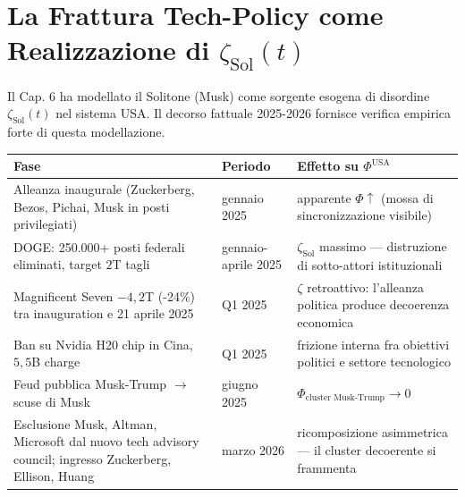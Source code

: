 \section{\texorpdfstring{La Frattura Tech-Policy come Realizzazione di
\(\zeta_{\text{Sol}}(t)\)}{La Frattura Tech-Policy come Realizzazione di \textbackslash zeta\_\{\textbackslash text\{Sol\}\}(t)}}\label{la-frattura-tech-policy-come-realizzazione-di-zeta_textsolt}

Il Cap. 6 ha modellato il Solitone (Musk) come sorgente esogena di
disordine \(\zeta_{\text{Sol}}(t)\) nel sistema USA. Il decorso fattuale
2025-2026 fornisce verifica empirica forte di questa modellazione.

{\def\LTcaptype{none} %
{\small\begin{longtable}[]{@{}
  >{\raggedright\arraybackslash}p{}
  >{\raggedright\arraybackslash}p{}
  >{\raggedright\arraybackslash}p{}@{}}
\toprule\noalign{}
\begin{minipage}[b]{\linewidth}\raggedright
Fase
\end{minipage} & \begin{minipage}[b]{\linewidth}\raggedright
Periodo
\end{minipage} & \begin{minipage}[b]{\linewidth}\raggedright
Effetto su \(\Phi^{\text{USA}}\)
\end{minipage} \\
\midrule\noalign{}
\endhead
\bottomrule\noalign{}
\endlastfoot
Alleanza inaugurale (Zuckerberg, Bezos, Pichai, Musk in posti
privilegiati) & 20 gennaio 2025 & apparente \(\Phi \uparrow\) (mossa di
sincronizzazione visibile) \\
DOGE: 250.000+ posti federali eliminati, target \(2\)T tagli &
gennaio-aprile 2025 & \(\zeta_{\text{Sol}}\) massimo --- distruzione di
sotto-attori istituzionali \\
Magnificent Seven \(-4{,}2\)T (-24\%) tra inauguration e 21 aprile 2025
& Q1 2025 & \(\zeta\) retroattivo: l'alleanza politica produce
decoerenza economica \\
Ban su Nvidia H20 chip in Cina, \(5{,}5\)B charge & Q1 2025 & frizione
interna fra obiettivi politici e settore tecnologico \\
Feud pubblica Musk-Trump $\to$ scuse di Musk & giugno 2025 &
\(\Phi_{\text{cluster Musk-Trump}} \to 0\) \\
Esclusione Musk, Altman, Microsoft dal nuovo tech advisory council;
ingresso Zuckerberg, Ellison, Huang & marzo 2026 & ricomposizione
asimmetrica --- il cluster decoerente si frammenta \\
\end{longtable}}
}

